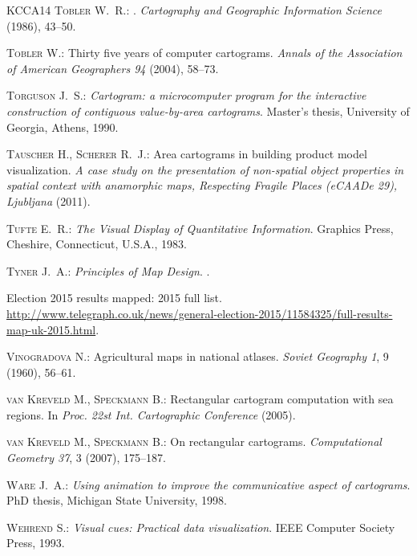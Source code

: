\documentclass{egpubl}
\begin{document}
\begin{thebibliography}{\uppercase{KCCA{\etalchar{*}}14}}
\textsc{Tobler W.~R.}:
.
\newblock \emph{Cartography and Geographic Information Science} (1986), 43--50.

\textsc{Tobler W.}:
\newblock Thirty five years of computer cartograms.
\newblock \emph{Annals of the Association of American Geographers 94} (2004),
  58--73.

\textsc{Torguson J.~S.}:
\newblock \emph{Cartogram: a microcomputer program for the interactive
  construction of contiguous value-by-area cartograms}.
\newblock Master's thesis, University of Georgia, Athens, 1990.

\textsc{Tauscher H., Scherer R.~J.}:
\newblock Area cartograms in building product model visualization.
\newblock \emph{A case study on the presentation of non-spatial object
  properties in spatial context with anamorphic maps, Respecting Fragile Places
  (eCAADe 29), Ljubljana} (2011).

\textsc{Tufte E.~R.}:
\newblock \emph{The Visual Display of Quantitative Information}.
\newblock Graphics Press, Cheshire, Connecticut, U.S.A., 1983.

\textsc{Tyner J.~A.}:
\newblock \emph{Principles of Map Design}.
.

Election 2015 results mapped: 2015 full list.
\newblock
  \url{http://www.telegraph.co.uk/news/general-election-2015/11584325/full-results-map-uk-2015.html}.

\textsc{Vinogradova N.}:
\newblock Agricultural maps in national atlases.
\newblock \emph{Soviet Geography 1}, 9 (1960), 56--61.

\textsc{van Kreveld M., Speckmann B.}:
\newblock Rectangular cartogram computation with sea regions.
\newblock In \emph{Proc. 22st Int. Cartographic Conference} (2005).

\textsc{van Kreveld M., Speckmann B.}:
\newblock On rectangular cartograms.
\newblock \emph{Computational Geometry 37}, 3 (2007), 175--187.

\textsc{Ware J.~A.}:
\newblock \emph{Using animation to improve the communicative aspect of
  cartograms}.
\newblock PhD thesis, Michigan State University, 1998.

\textsc{Wehrend S.}:
\newblock \emph{Visual cues: Practical data visualization}.
\newblock IEEE Computer Society Press, 1993.


\end{thebibliography}
\end{document}
